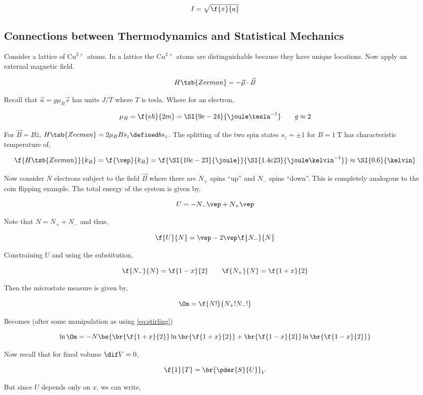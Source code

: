 \documentclass{article}
\begin{document}
\[ I = \sqrt{\f{\pi}{a}} \]

\subsection{Connections between Thermodynamics and Statistical Mechanics}

Consider a lattice of $\text{Cu}^{2+}$ atoms. In a lattice the $\text{Cu}^{2+}$ atoms are distinguishable because they have unique locations. Now apply an external magnetic field.

\[ H\tsb{Zeeman} = - \vec{\mu} \cdot \vec{B} \]

Recall that $\vec{u} = g \mu_B \vec{s}$ has units $J/T$ where $T$ is tesla. Where for an electron,

\[ \mu_B = \f{e\hbar}{2m} = \SI{9e-24}{\joule \tesla^{-1}} \qquad g \approx 2 \]

For $\vec{B} = B \hat{z}$, $H\tsb{Zeeman} = 2\mu_BBs_z \defined b s_z$. The splitting of the two spin states $s_z = \pm 1$ for $B = \SI{1}{\tesla}$ has characteristic temperature of,

\[ \f{H\tsb{Zeeman}}{k_B} = \f{\vep}{k_B} = \f{\SI{10e-23}{\joule}}{\SI{1.4e23}{\joule\kelvin^{-1}}} \approx \SI{0.6}{\kelvin} \]

Now consider $N$ electrons subject to the field $\vec{B}$ where there are $N_+$ spins ``up'' and $N_-$ spins ``down''. This is completely analogous to the coin flipping example. The total energy of the system is given by,

\[ U = - N_- \vep + N_+ \vep \]

Note that $N = N_+ + N_-$ and thus,

\[ \f{U}{N} = \vep - 2 \vep \f{N_-}{N} \]

Constraining $U$ and using the substitution,

\[ \f{N_-}{N} = \f{1-x}{2} \qquad \f{N_+}{N} = \f{1+x}{2}\]

Then the microstate measure is given by,

\[ \Om = \f{N!}{N_+!N_-!} \]

Becomes (after some manipulation as using \eqref{eq:stirling})

\[ \ln\Om = -N\bs{\br{\f{1+x}{2}}\ln\br{\f{1+x}{2}} + \br{\f{1-x}{2}}\ln\br{\f{1-x}{2}}} \]

Now recall that for fixed volume $\dif V = 0$,

\[ \f{1}{T} = \br{\pder{S}{U}}_V \]

But since $U$ depends only on $x$, we can write,
\end{document}
